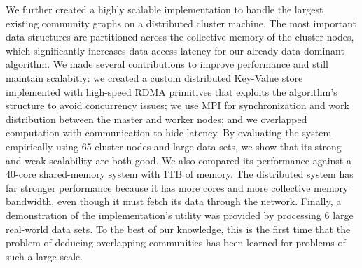 We further created a highly scalable implementation to handle the largest existing
community graphs on a distributed cluster machine. The most important data structures
are partitioned across the collective memory of the cluster nodes, which
significantly increases data access latency for our already data-dominant algorithm.
We made several contributions to improve performance and still maintain scalabitiy:
we created a custom distributed Key-Value store implemented with high-speed RDMA
primitives that exploits the algorithm's structure to avoid concurrency issues; we
use MPI for synchronization and work distribution between the master and worker nodes;
and
we overlapped computation
with communication to hide latency.
%
By evaluating the system empirically using 65 cluster nodes and large data sets,
we show that its strong and weak scalability are both good. We also compared its
performance against a 40-core shared-memory system with 1TB of memory.
The distributed system has far stronger performance because it has more cores and
more collective memory bandwidth, even though it must fetch its data through the network.
Finally, a
demonstration of the implementation's utility was provided by processing 6
large real-world data sets.
To the best of
our knowledge, this is the first time that the problem of deducing overlapping
communities has been learned for problems of such a large scale.
